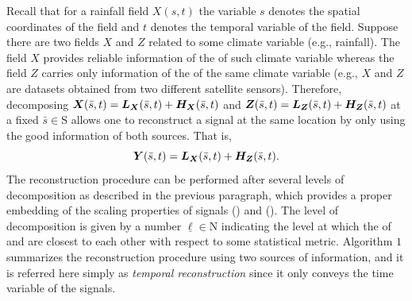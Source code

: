 {Recall that for a rainfall field $X(s,t)$ the variable $s$ denotes the spatial coordinates of the field and $t$ denotes the temporal variable of the field. Suppose there are two fields $X$ and $Z$ related to some climate variable (e.g., rainfall). The field $X$  provides reliable information of the  of such climate variable whereas the field $Z$ carries only information of the  of the same climate variable (e.g., $X$ and $Z$ are datasets obtained  from two different satellite sensors). Therefore, decomposing $\text{\boldmath$X$}(\bar{s},t) = \text{\boldmath$L_X$}(\bar{s},t)+\text{\boldmath$H_X$}(\bar{s},t)$ and $\text{\boldmath$Z$}(\bar{s},t) = \text{\boldmath$L_Z$}(\bar{s},t)+\text{\boldmath$H_Z$}(\bar{s},t)$ at a fixed $\bar{s} \in \mbox{S}$ allows one to reconstruct a signal  at the same location by only using the good information of both sources. That is,   
\begin{equation}
\text{\boldmath$Y$}(\bar{s},t) = \text{\boldmath$L_X$}(\bar{s},t) +\text{\boldmath$H_Z$}(\bar{s},t).	
\end{equation}
The reconstruction procedure can be performed after several levels of decomposition as described in the previous paragraph, which provides a proper embedding of the scaling properties of signals  () and  (). The level of decomposition is given by a number $\underline{\ell} \in \mbox{N}$ indicating the level at which the  of  and  are closest to each other with respect to some statistical metric.  Algorithm $1$ summarizes the reconstruction procedure using two sources of information, and it is referred here simply as \emph{temporal reconstruction} since it only conveys the time variable of the signals.  

}
